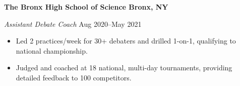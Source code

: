 \textbf{The Bronx High School of Science \hfill Bronx, NY} \par
\textit{Assistant Debate Coach}  \hfill Aug 2020--May 2021
\begin{itemize}
	\item Led 2 practices/week for 30+ debaters and drilled 1-on-1, qualifying to national championship.
	\item Judged and coached at 18 national, multi-day tournaments, providing detailed feedback to 100 competitors.
\end{itemize}\par